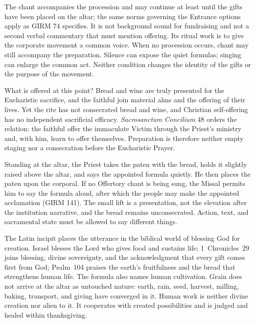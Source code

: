 The chant accompanies the procession and may continue at least until the gifts have been placed on the altar; the same norms governing the Entrance options apply as GIRM 74 specifies. It is not background sound for fundraising and not a second verbal commentary that must mention offering. Its ritual work is to give the corporate movement a common voice. When no procession occurs, chant may still accompany the preparation. Silence can expose the quiet formulas; singing can enlarge the common act. Neither condition changes the identity of the gifts or the purpose of the movement.

\begin{studybox}{What is offered at this point?}
Bread and wine are truly presented for the Eucharistic sacrifice, and the faithful join material alms and the offering of their lives. Yet the rite has not consecrated bread and wine, and Christian self-offering has no independent sacrificial efficacy. \emph{Sacrosanctum Concilium} 48 orders the relation: the faithful offer the immaculate Victim through the Priest's ministry and, with him, learn to offer themselves. Preparation is therefore neither empty staging nor a consecration before the Eucharistic Prayer.
\end{studybox}


Standing at the altar, the Priest takes the paten with the bread, holds it slightly raised above the altar, and says the appointed formula quietly. He then places the paten upon the corporal. If no Offertory chant is being sung, the Missal permits him to say the formula aloud, after which the people may make the appointed acclamation (GIRM 141). The small lift is a presentation, not the elevation after the institution narrative, and the bread remains unconsecrated. Action, text, and sacramental state must be allowed to say different things.

The Latin incipit  places the utterance in the biblical world of blessing God for creation. Israel blesses the Lord who gives food and sustains life; 1~Chronicles~29 joins blessing, divine sovereignty, and the acknowledgment that every gift comes first from God; Psalm~104 praises the earth's fruitfulness and the bread that strengthens human life. The formula also names human cultivation. Grain does not arrive at the altar as untouched nature: earth, rain, seed, harvest, milling, baking, transport, and giving have converged in it. Human work is neither divine creation nor alien to it. It cooperates with created possibilities and is judged and healed within thanksgiving.


